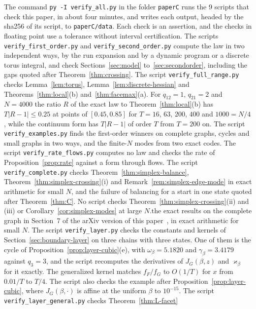 The command \texttt{py -I verify\_all.py} in the folder \nolinkurl{paperC} runs the
9 scripts that check this paper, in about four minutes, and writes each output,
headed by the sha256 of its script, to \nolinkurl{paperC/data}. Each check is an
assertion, and the checks in floating point use a tolerance without interval
certification. The scripts \texttt{verify\_first\_order.py} and
\texttt{verify\_second\_order.py} compute the law in two independent ways, by the run
expansion and by a dynamic program or a discrete torus integral, and check
Sections~\ref{sec:model} to~\ref{sec:secondorder}, including the gaps quoted after
Theorem~\ref{thm:crossing}. The script \texttt{verify\_full\_range.py} checks
Lemma~\ref{lem:torus}, Lemma~\ref{lem:discrete-hessian} and Theorems~\ref{thm:local}(b)
and~\ref{thm:facemax}(a). For $q_{12}=1$, $q_{21}=2$ and $N=4000$ the ratio $R$ of the exact
law to Theorem~\ref{thm:local}(b) has $T|R-1|\le0.25$ at points of $[0.45,0.85]$ for $T=16$, $63$, $200$, $400$
and $1000=N/4$, while the continuum form has $T|R-1|$ of order $T$ from $T=200$ on. The script \texttt{verify\_examples.py} finds the
first-order winners on complete graphs, cycles and small graphs in two ways, and the
finite-$N$ modes from two exact codes. The script \texttt{verify\_rate\_flows.py}
computes no law and checks the rate of Proposition~\ref{prop:rate} against a form
through flows. The script \texttt{verify\_complete.py} checks
\ifarxivbuild Theorem~\ref{thm:simplex-balance}, Theorem~\ref{thm:simplex-crossing}(i) and
Remark~\ref{rem:simplex-edge-mode} in exact arithmetic for small $N$, and the failure of
balancing for a start in one state quoted after Theorem~\ref{thm:C}. No script checks
Theorem~\ref{thm:simplex-crossing}(ii) and (iii) or Corollary~\ref{cor:simplex-modes}
at large $N$.\else the exact results on the complete graph in Section~7 of the arXiv version of
this paper~\cite{arxivC1}, in exact arithmetic for small $N$.\fi{} The script \texttt{verify\_layer.py} checks the constants and kernels of
Section~\ref{sec:boundary-layer} on three chains with three states. One of them
is the cycle of Proposition~\ref{prop:layer-cubic}(e), with $\omega_\beta=5.1820$
and $\gamma_\beta=3.4179$ against $q_3=3$, and the script recomputes the
derivatives of $J_G(\beta,z)$ and $\varkappa_\beta$ for it exactly. The
generalized kernel matches $f_F/f_G$ to $O(1/T)$ for $x$ from $0.01/T$ to $T/4$. The
script also checks the example after Proposition~\ref{prop:layer-cubic}, where
$J_G(\beta,\cdot)$ is affine at the uniform $\beta$ to $10^{-15}$.
The script \texttt{verify\_layer\_general.py} checks Theorem~\ref{thm:L-facet}
